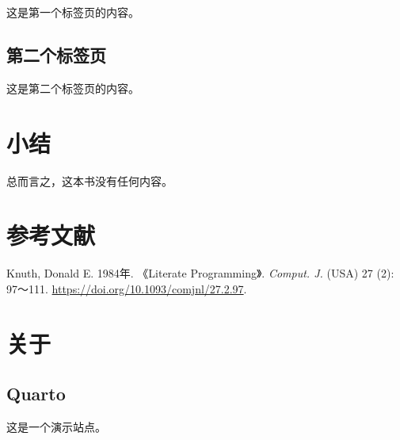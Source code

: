 \documentclass[
  chinese-hans,
  letterpaper,
  DIV=11,
  numbers=noendperiod]{scrreprt}
\newlength{\cslhangindent}
\newenvironment{CSLReferences}[2] %
 {\begin{list}{}{%
  \setlength{\itemindent}{0pt}
  \setlength{\leftmargin}{0pt}
  \setlength{\parsep}{0pt}
  \ifodd #1
   \setlength{\leftmargin}{\cslhangindent}
   \setlength{\itemindent}{-1\cslhangindent}
  \fi
  \setlength{\itemsep}{#2\baselineskip}}}
 {\end{list}}
\begin{document}
这是第一个标签页的内容。

\section{第二个标签页}

这是第二个标签页的内容。

\chapter{小结}\label{ux5c0fux7ed3}

总而言之，这本书没有任何内容。


\chapter*{参考文献}\label{ux53c2ux8003ux6587ux732e}


\protect{}\label{refs}
\begin{CSLReferences}{1}{1}
Knuth, Donald E. 1984年. {《Literate Programming》}. \emph{Comput. J.}
(USA) 27 (2): 97～111. \url{https://doi.org/10.1093/comjnl/27.2.97}.

\end{CSLReferences}


\chapter*{关于}\label{ux5173ux4e8e}


\section*{Quarto}\label{quarto}


这是一个演示站点。
\end{document}
